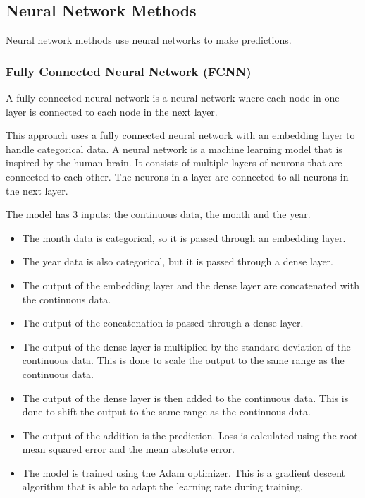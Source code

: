 \documentclass[manuscript,screen,nonacm,11pt]{acmart}
\numberwithin{equation}{section}
\begin{document}
\subsection{Neural Network Methods}
Neural network methods use neural networks to make predictions.
\subsubsection{Fully Connected Neural Network (FCNN)}
A fully connected neural network is a neural network where each node in one
    layer is connected to each node in the next layer.

	This approach uses a fully connected neural network with an embedding layer 
	to handle categorical data.
	A neural network is a machine learning model that is inspired by the human brain.
	It consists of multiple layers of neurons that are connected to each other.
	The neurons in a layer are connected to all neurons in the next layer.
	
	The model has 3 inputs: the continuous data, the month and the year.
	\begin{itemize}
		\item The month data is categorical, so it is passed through an embedding layer.
		\item The year data is also categorical, but it is passed through a dense layer.
		\item The output of the embedding layer and the dense layer are concatenated with the continuous data.
		\item The output of the concatenation is passed through a dense layer.
		\item The output of the dense layer is multiplied by the standard deviation of the continuous data. 
		This is done to scale the output to the same range as the continuous data.
		\item The output of the dense layer is then added to the continuous data. This is done to shift 
		the output to the same range as the continuous data.
		\item The output of the addition is the prediction.
		Loss is calculated using the root mean squared error and the mean absolute error.
		\item The model is trained using the Adam optimizer. This is a gradient descent algorithm that
		is able to adapt the learning rate during training.
	\end{itemize}
\end{document}
